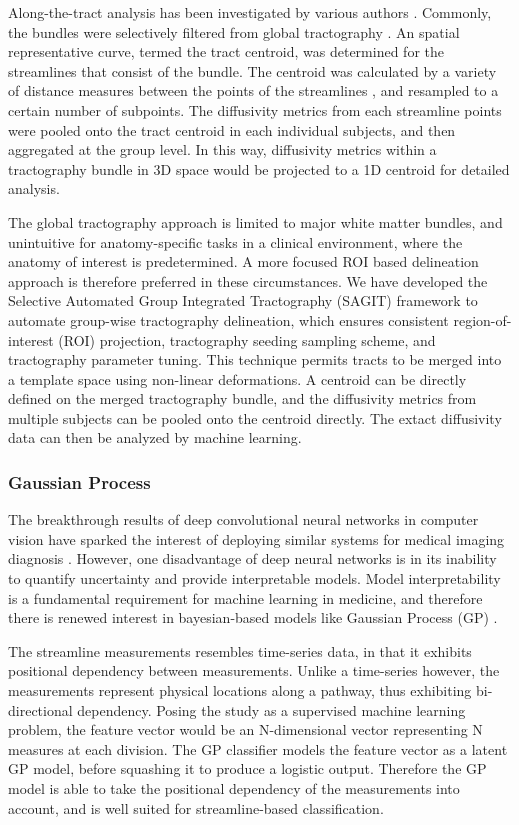 Along-the-tract analysis has been investigated by various authors \cite{Colby2012,ODonnell2009,Wang2015,Yeatman2012}. Commonly, the bundles were selectively filtered from global tractography \cite{Wang2015,Yeatman2012}. An spatial representative curve, termed the tract centroid, was determined for the streamlines that consist of the bundle. The centroid was calculated by a variety of distance measures between the points of the streamlines \cite{Garyfallidis2012}, and resampled to a certain number of subpoints. The diffusivity metrics from each streamline points were pooled onto the tract centroid in each individual subjects, and then aggregated at the group level. In this way, diffusivity metrics within a tractography bundle in 3D space would be projected to a 1D centroid for detailed analysis. 

The global tractography approach is limited to major white matter bundles, and unintuitive for anatomy-specific tasks in a clinical environment, where the anatomy of interest is predetermined. A more focused ROI based delineation approach is therefore preferred in these circumstances. We have developed the Selective Automated Group Integrated Tractography (SAGIT) framework \cite{Chen2016} to automate group-wise tractography delineation, which ensures consistent region-of-interest (ROI) projection, tractography seeding sampling scheme, and tractography parameter tuning. This technique permits tracts to be merged into a template space using non-linear deformations. A centroid can be directly defined on the merged tractography bundle, and the diffusivity metrics from multiple subjects can be pooled onto the centroid directly. The extact diffusivity data can then be analyzed by machine learning.

\subsubsection{Gaussian Process}
The breakthrough results of deep convolutional neural networks in computer vision \cite{Krizhevsky2012} have sparked the interest of deploying similar systems for medical imaging diagnosis \cite{Greenspan2016}. However, one disadvantage of deep neural networks is in its inability to quantify uncertainty and provide interpretable models. Model interpretability is a fundamental requirement for machine learning in medicine, and therefore there is renewed interest in bayesian-based models like Gaussian Process (GP) \cite{gal2016dropout}.

The streamline measurements resembles time-series data, in that it exhibits positional dependency between measurements. Unlike a time-series however, the measurements represent physical locations along a pathway, thus exhibiting bi-directional dependency. Posing the study as a supervised machine learning problem, the feature vector would be an N-dimensional vector representing N measures at each division. The GP classifier models the feature vector as a latent GP model, before squashing it to produce a logistic output. Therefore the GP model is able to take the positional dependency of the measurements into account, and is well suited for streamline-based classification.

